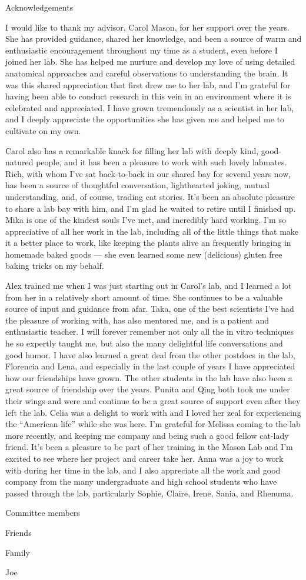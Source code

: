 {\centering
\LARGE
Acknowledgements
\par
}

I would like to thank my advisor, Carol Mason, for her support over the years.
She has provided guidance, shared her knowledge, and been a source of warm and enthusiastic encouragement throughout my time as a student, even before I joined her lab.
She has helped me nurture and develop my love of using detailed anatomical approaches and careful observations to understanding the brain.
It was this shared appreciation that first drew me to her lab, and I'm grateful for having been able to conduct research in this vein in an environment where it is celebrated and appreciated.
I have grown tremendously as a scientist in her lab, and I deeply appreciate the opportunities she has given me and helped me to cultivate on my own.

Carol also has a remarkable knack for filling her lab with deeply kind, good-natured people, and it has been a pleasure to work with such lovely labmates.
Rich, with whom I've sat back-to-back in our shared bay for several years now, has been a source of thoughtful conversation, lighthearted joking, mutual understanding, and, of course, trading cat stories.
It's been an absolute pleasure to share a lab bay with him, and I'm glad he waited to retire until I finished up.
Mika is one of the kindest souls I've met, and incredibly hard working.
I'm so appreciative of all her work in the lab, including all of the little things that make it a better place to work, like keeping the plants alive an frequently bringing in homemade baked goods --- she even learned some new (delicious) gluten free baking tricks on my behalf.

Alex trained me when I was just starting out in Carol's lab, and I learned a lot from her in a relatively short amount of time.
She continues to be a valuable source of input and guidance from afar.
Taka, one of the best scientists I've had the pleasure of working with, has also mentored me, and is a patient and enthusiastic teacher.
I will forever remember not only all the in vitro techniques he so expertly taught me, but also the many delightful life conversations and good humor.
I have also learned a great deal from the other postdocs in the lab, Florencia and Lena, and especially in the last couple of years I have appreciated how our friendships have grown.
The other students in the lab have also been a great source of friendship over the years.
Punita and Qing both took me under their wings and were and continue to be a great source of support even after they left the lab.
Celia was a delight to work with and I loved her zeal for experiencing the ``American life'' while she was here.
I'm grateful for Melissa coming to the lab more recently, and keeping me company and being such a good fellow cat-lady friend.
It's been a pleasure to be part of her training in the Mason Lab and I'm excited to see where her project and career take her.
Anna was a joy to work with during her time in the lab, and I also appreciate all the work and good company from the many undergraduate and high school students who have passed through the lab, particularly Sophie, Claire, Irene, Sania, and Rhenuma.

Committee members

Friends

Family

Joe